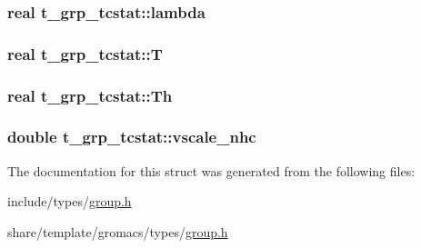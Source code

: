 \hypertarget{structt__grp__tcstat_a8b187e1463143346a66cd19a1b99b221}{
\subsubsection[{lambda}]{\setlength{\rightskip}{0pt plus 5cm}real {\bf t\-\_\-grp\-\_\-tcstat\-::lambda}}}\label{structt__grp__tcstat_a8b187e1463143346a66cd19a1b99b221}
\hypertarget{structt__grp__tcstat_a12387599d089d6c24ad9ebfe5b7d6f9e}{
\subsubsection[{\-T}]{\setlength{\rightskip}{0pt plus 5cm}real {\bf t\-\_\-grp\-\_\-tcstat\-::\-T}}}\label{structt__grp__tcstat_a12387599d089d6c24ad9ebfe5b7d6f9e}
\hypertarget{structt__grp__tcstat_ae9abd095cfdcce942aaac949a01ea152}{
\subsubsection[{\-Th}]{\setlength{\rightskip}{0pt plus 5cm}real {\bf t\-\_\-grp\-\_\-tcstat\-::\-Th}}}\label{structt__grp__tcstat_ae9abd095cfdcce942aaac949a01ea152}
\hypertarget{structt__grp__tcstat_a66e5614e6198be6a92812b04bc0c3c96}{
\subsubsection[{vscale\-\_\-nhc}]{\setlength{\rightskip}{0pt plus 5cm}double {\bf t\-\_\-grp\-\_\-tcstat\-::vscale\-\_\-nhc}}}\label{structt__grp__tcstat_a66e5614e6198be6a92812b04bc0c3c96}


\-The documentation for this struct was generated from the following files\-:\begin{DoxyCompactItemize}
\item 
include/types/\hyperlink{include_2types_2group_8h}{group.\-h}\item 
share/template/gromacs/types/\hyperlink{share_2template_2gromacs_2types_2group_8h}{group.\-h}\end{DoxyCompactItemize}
